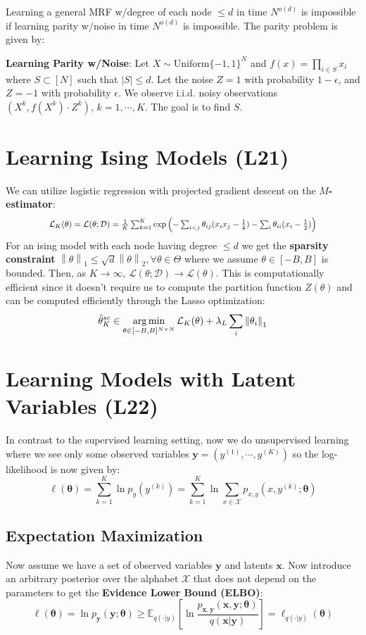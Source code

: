 \documentclass[9pt]{article}
\begin{document}
\begin{multicols}{2}
Learning a general MRF w/degree of each node $\le d$ in time $N^{o(d)}$ is impossible if learning parity w/noise in time $N^{o(d)}$ is impossible. The parity problem is given by:

\textbf{Learning Parity w/Noise}: Let $X \sim \text{Uniform}\{-1,1\}^{N}$ and $f(x) =\prod_{i \in S}x_i$ where $S \subset [N]$ 
such that $|S| \le d$. Let the noise $Z=1$ with probability $1-\epsilon$, and $Z=-1$ with probability $\epsilon$. We observe i.i.d.
noisy observations $(X^{k},f(X^k)\cdot Z^k)$, $k=1,\cdots, K$. The
goal is to find $S$.

\section{Learning Ising Models (L21)}
We can utilize logistic regression with projected gradient descent
on the \textbf{$M$-estimator}:
\[
\scalebox{0.85}{
\(
\mathcal{L}_{K}(\theta)=\mathcal{L}(\theta;\mathcal{D})=\frac{1}{K}\sum_{k=1}^{K}\exp\left(-\sum_{i < j}\theta_{ij}(x_ix_j-\frac{1}{4})-\sum_{i}\theta_{ii}(x_i-\frac{1}{2})\right)
\)
}
\]
For an ising model with each node having degree $\le d$ we get the \textbf{sparsity constraint} $\left\|\theta\right\|_1 \le \sqrt{d}\left\|\theta\right\|_2, \forall \theta \in \Theta$ where
we assume $\theta \in [-B,B]$ is bounded. Then, as $K \to \infty$, 
$\mathcal{L}(\theta;\mathcal{D}) \to \mathcal{L}(\theta)$. This
is computationally efficient since it doesn't require us to compute
the partition function $Z(\theta)$ and can be computed efficiently
through the Lasso optimization:
$$\hat\theta_{K}^{sc} \in \operatorname*{arg\,min}_{\theta \in [-B,B]^{N \times N}} \mathcal{L}_{K}(\theta)+\lambda_{L}\sum_{i}\left\|\theta_i\right\|_1$$

\section{Learning Models with Latent Variables (L22)}

In contrast to the supervised learning setting, now we do unsupervised learning where we see only some observed variables $\mathbf{y}=(y^{(1)},\cdots,y^{(K)})$ so the log-likelihood is now
given by: 
$$\ell(\boldsymbol{\theta})=\sum_{k=1}^{K}\ln p_{y}(y^{(k)})=\sum_{k=1}^{K}\ln\sum_{x \in \mathcal{X}}p_{x,y}(x,y^{(k)};\boldsymbol{\theta})$$
\subsection{Expectation Maximization}
Now assume we have a set of observed variables $\mathbf{y}$ and 
latents $\mathbf{x}$. Now introduce an arbitrary posterior over
the alphabet $\mathcal{X}$ that does not depend on the parameters 
to get the \textbf{Evidence Lower Bound (ELBO)}: 
$$\ell(\boldsymbol{\theta})=\ln p_{\mathbf{y}}(\mathbf{y};\boldsymbol{\theta}) \ge \mathbb{E}_{q(\cdot|y)}\left[\ln\frac{p_{\mathbf{x},\mathbf{y}}(\mathbf{x},\mathbf{y};\boldsymbol{\theta})}{q(\mathbf{x}|\mathbf{y})}\right]=\ell_{q(\cdot|y)}(\boldsymbol{\theta})$$


\end{multicols}
\end{document}

